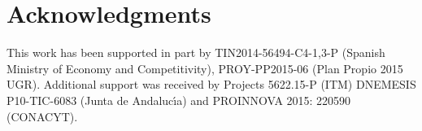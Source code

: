 \documentclass{sig-alternate}
\begin{document}
\section*{Acknowledgments}
 
This work has been supported in part by
TIN2014-56494-C4-{1,3}-P (Spanish Ministry of Economy and Competitivity), PROY-PP2015-06 (Plan Propio 2015 UGR). Additional support was received by
Projects 5622.15-P (ITM) DNEMESIS P10-TIC-6083 (Junta de Andaluc\'{\i}a) and PROINNOVA 2015: 220590 (CONACYT).



\end{document}
